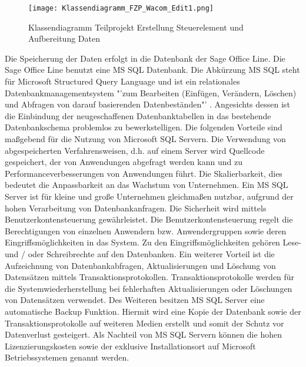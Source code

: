 \begin{figure}[!ht]
    \centering
    \texttt{[image: Klassendiagramm\_FZP\_Wacom\_Edit1.png]}
    \caption[Klassendiagramm Erstellung Steuerelement und Aufbereitung Daten]{\small{Klassendiagramm Teilprojekt Erstellung Steuerelement und Aufbereitung Daten}}
\end{figure}
\newline
\pagebreak
\textbf{} %
\newline
Die Speicherung der Daten erfolgt in die Datenbank der Sage Office Line. Die Sage Office Line benutzt eine MS SQL Datenbank. Die Abkürzung MS SQL steht für Microsoft Structured Query Language und ist ein relationales Datenbankmanagementsystem "'zum Bearbeiten (Einfügen, Verändern, Löschen) und Abfragen von darauf basierenden Datenbeständen"' \cite{sql1} \cite{sql2}. Angesichts dessen ist die Einbindung der neugeschaffenen Datenbanktabellen in das bestehende Datenbankschema problemlos zu bewerkstelligen. Die folgenden Vorteile sind maßgebend für die Nutzung von Microsoft SQL Servern. Die Verwendung von abgespeicherten Verfahrensweisen, d.h. auf einem Server wird Quellcode  gespeichert, der von Anwendungen abgefragt werden kann und zu Performanceverbesserungen von Anwendungen führt. Die Skalierbarkeit, dies bedeutet die Anpassbarkeit an das Wachstum von Unternehmen. Ein MS SQL Server ist für kleine und große Unternehmen gleichmaßen nutzbar, aufgrund der hohen Verarbeitung von Datenbankanfragen. Die Sicherheit wird mittels Benutzerkontensteuerung gewährleistet. Die Benutzerkontensteuerung regelt die Berechtigungen von einzelnen Anwendern bzw. Anwendergruppen sowie deren Eingriffsmöglichkeiten in das System. Zu den Eingriffsmöglichkeiten gehören Lese- und / oder Schreibrechte auf den Datenbanken. Ein weiterer Vorteil ist die Aufzeichnung von Datenbankabfragen, Aktualisierungen und Löschung von Datensätzen mittels Transaktionsprotokollen. Transaktionsprotokolle werden für die Systemwiederherstellung bei fehlerhaften Aktualisierungen oder Löschungen von Datensätzen verwendet. Des Weiteren besitzen MS SQL Server eine automatische Backup Funktion. Hiermit wird eine Kopie der Datenbank sowie der Transaktionsprotokolle auf weiteren Medien erstellt und somit der Schutz vor Datenverlust gesteigert. Als Nachteil von MS SQL Servern können die hohen Lizenzierungskosten sowie der exklusive Installationsort auf Microsoft Betriebssystemen genannt werden. \cite{SQLv1}